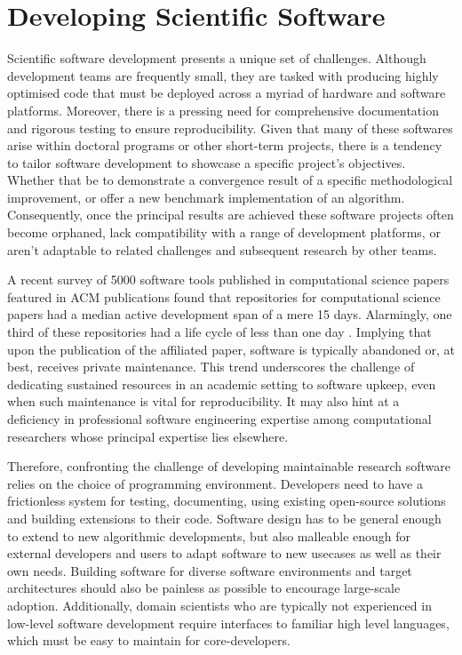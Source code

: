 \section{Developing Scientific Software}\label{chpt:1:sec:0}

Scientific software development presents a unique set of challenges. Although development teams are frequently small, they are tasked with producing highly optimised code that must be deployed across a myriad of hardware and software platforms. Moreover, there is a pressing need for comprehensive documentation and rigorous testing to ensure reproducibility. Given that many of these softwares arise within doctoral programs or other short-term projects, there is a tendency to tailor software development to showcase a specific project's objectives. Whether that be to demonstrate a convergence result of a specific methodological improvement, or offer a new benchmark implementation of an algorithm. Consequently, once the principal results are achieved these software projects often become orphaned, lack compatibility with a range of development platforms, or aren't adaptable to related challenges and subsequent research by other teams.

A recent survey of 5000 software tools published in computational science papers featured in ACM publications found that repositories for computational science papers had a median active development span of a mere 15 days. Alarmingly, one third of these repositories had a life cycle of less than one day \cite{hasselbring2020open}. Implying that upon the publication of the affiliated paper, software is typically abandoned or, at best, receives private maintenance. This trend underscores the challenge of dedicating sustained resources in an academic setting to software upkeep, even when such maintenance is vital for reproducibility. It may also hint at a deficiency in professional software engineering expertise among computational researchers whose principal expertise lies elsewhere.

Therefore, confronting the challenge of developing maintainable research software relies on the choice of programming environment. Developers need to have a frictionless system for testing, documenting, using existing open-source solutions and building extensions to their code. Software design has to be general enough to extend to new algorithmic developments, but also malleable enough for external developers and users to adapt software to new usecases as well as their own needs. Building software for diverse software environments and target architectures should also be painless as possible to encourage large-scale adoption. Additionally, domain scientists who are typically not experienced in low-level software development require interfaces to familiar high level languages, which must be easy to maintain for core-developers.

